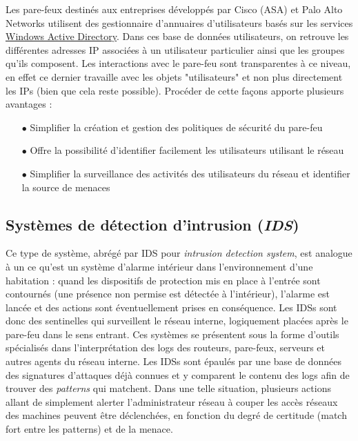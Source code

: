 \documentclass[]{article}
\begin{document}
\par Les pare-feux destinés aux entreprises développés par Cisco (ASA) \cite{cisco2018} et Palo Alto Networks \cite{Kokko2017} utilisent des gestionnaire d'annuaires d'utilisateurs basés sur les services \href{https://fr.wikipedia.org/wiki/Active_Directory}{Windows Active Directory}. Dans ces base de données utilisateurs, on retrouve les différentes adresses IP associées à un utilisateur particulier ainsi que les groupes qu'ils composent. Les interactions avec le pare-feu sont transparentes à ce niveau, en effet ce dernier travaille avec les objets "utilisateurs" et non plus directement les IPs (bien que cela reste possible). Procéder de cette façons apporte plusieurs avantages \cite{cisco2018}:
\vspace{0.2cm}
\begin{itemize}
\item[$\bullet$] Simplifier la création et gestion des politiques de sécurité du pare-feu
\vspace{0.2cm}
\item[$\bullet$] Offre la possibilité d'identifier facilement les utilisateurs utilisant le réseau
\vspace{0.2cm}
\item[$\bullet$] Simplifier la surveillance des activités des utilisateurs du réseau et identifier la source de menaces
\end{itemize} 


\subsection{Systèmes de détection d'intrusion (\textit{IDS})}\label{IDS}
Ce type de système, abrégé par IDS pour \textit{intrusion detection system}, est analogue à un ce qu'est un système d'alarme intérieur dans l'environnement d'une habitation : quand les dispositifs de protection mis en place à l'entrée sont contournés (une présence non permise est détectée à l'intérieur), l'alarme est lancée et des actions sont éventuellement prises en conséquence. Les IDSs sont donc des sentinelles qui surveillent le réseau interne, logiquement placées après le pare-feu dans le sens entrant. Ces systèmes se présentent sous la forme d'outils spécialisés dans l’interprétation des logs des routeurs, pare-feux, serveurs et autres agents du réseau interne. Les IDSs sont épaulés par une base de données des signatures d'attaques déjà connues et y comparent le contenu des logs afin de trouver des \textit{patterns} qui matchent. Dans une telle situation, plusieurs actions allant de simplement alerter l'administrateur réseau à couper les accès réseaux des machines peuvent être déclenchées, en fonction du degré de certitude (match fort entre les patterns) et de la menace.\\
\end{document}
